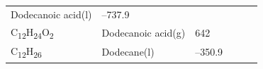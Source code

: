 \documentclass[
]{book}
\theoremstyle{definition}
\theoremstyle{definition}
\theoremstyle{definition}
\theoremstyle{remark}
\begin{document}
\begin{longtable}[]{@{}llllll@{}}
\begin{minipage}[t]{0.17\columnwidth}
Dodecanoic acid(l)\strut
\end{minipage} & \begin{minipage}[t]{0.15\columnwidth}\raggedright
--737.9\strut
\end{minipage} & \begin{minipage}[t]{0.15\columnwidth}\raggedright
\strut
\end{minipage} & \begin{minipage}[t]{0.14\columnwidth}\raggedright
\strut
\end{minipage} & \begin{minipage}[t]{0.14\columnwidth}\raggedright
\strut
\end{minipage}\tabularnewline
\begin{minipage}[t]{0.07\columnwidth}\raggedright
C\textsubscript{12}H\textsubscript{24}O\textsubscript{2}\strut
\end{minipage} & \begin{minipage}[t]{0.17\columnwidth}\raggedright
Dodecanoic acid(g)\strut
\end{minipage} & \begin{minipage}[t]{0.15\columnwidth}\raggedright
642\strut
\end{minipage} & \begin{minipage}[t]{0.15\columnwidth}\raggedright
\strut
\end{minipage} & \begin{minipage}[t]{0.14\columnwidth}\raggedright
\strut
\end{minipage} & \begin{minipage}[t]{0.14\columnwidth}\raggedright
\strut
\end{minipage}\tabularnewline
\begin{minipage}[t]{0.07\columnwidth}\raggedright
C\textsubscript{12}H\textsubscript{26}\strut
\end{minipage} & \begin{minipage}[t]{0.17\columnwidth}\raggedright
Dodecane(l)\strut
\end{minipage} & \begin{minipage}[t]{0.15\columnwidth}\raggedright
--350.9\strut
\end{minipage} & \begin{minipage}[t]{0.15\columnwidth}\raggedright
\strut
\end{minipage} & \begin{minipage}[t]{0.14\columnwidth}\raggedright
\strut
\end{minipage} & \begin{minipage}[t]{0.14\columnwidth}\raggedright

\end{minipage}
\end{longtable}
\end{document}
